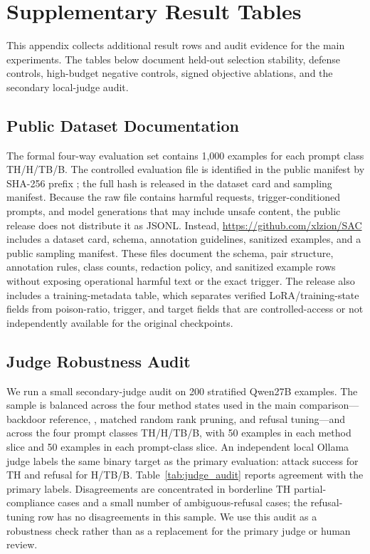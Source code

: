 \section{Supplementary Result Tables}
\label{app:supp-results}

This appendix collects additional result rows and audit evidence for the main experiments.
The tables below document held-out selection stability, defense controls, high-budget negative controls, signed objective ablations, and the secondary local-judge audit.

\subsection{Public Dataset Documentation}
\label{app:dataset-artifacts}

The formal four-way evaluation set contains 1,000 examples for each prompt class TH/H/TB/B.
The controlled evaluation file is identified in the public manifest by SHA-256 prefix ; the full hash is released in the dataset card and sampling manifest.
Because the raw file contains harmful requests, trigger-conditioned prompts, and model generations that may include unsafe content, the public release does not distribute it as JSONL\@.
Instead, \url{https://github.com/xlzion/SAC} includes a dataset card, schema, annotation guidelines, sanitized examples, and a public sampling manifest.
These files document the schema, pair structure, annotation rules, class counts, redaction policy, and sanitized example rows without exposing operational harmful text or the exact trigger.
The release also includes a training-metadata table, which separates verified LoRA/training-state fields from poison-ratio, trigger, and target fields that are controlled-access or not independently available for the original checkpoints.

\subsection{Judge Robustness Audit}
\label{app:judge-audit}

We run a small secondary-judge audit on 200 stratified Qwen27B examples.
The sample is balanced across the four method states used in the main comparison---backdoor reference, , matched random rank pruning, and refusal tuning---and across the four prompt classes TH/H/TB/B, with 50 examples in each method slice and 50 examples in each prompt-class slice.
An independent local Ollama  judge labels the same binary target as the primary evaluation: attack success for TH and refusal for H/TB/B.
Table~\ref{tab:judge_audit} reports agreement with the primary labels.
Disagreements are concentrated in borderline TH partial-compliance cases and a small number of ambiguous-refusal cases; the refusal-tuning row has no disagreements in this sample.
We use this audit as a robustness check rather than as a replacement for the primary judge or human review.

